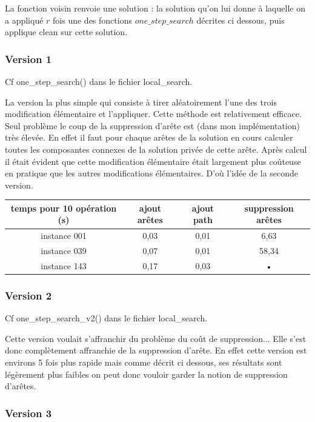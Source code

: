 \documentclass[10pt,a4paper]{article}
\begin{document}
La fonction voisin renvoie une solution : la solution qu'on lui donne à laquelle on a appliqué $r$ fois une des fonctions $one\_step\_search$ décrites ci dessous, puis applique clean sur cette solution.

\subsubsection{Version 1}

Cf one\_step\_search() dans le fichier local\_search.

La version la plus simple qui consiste à tirer aléatoirement l'une des trois modification élémentaire et l'appliquer. Cette méthode est relativement efficace. Seul problème le coup de la suppression d'arête est (dans mon implémentation) très élevée. En effet il faut pour chaque arêtes de la solution en cours calculer toutes les composantes connexes de la solution privée de cette arête. Après calcul il était évident que cette modification élémentaire était largement plus coûteuse en pratique que les autres modifications élémentaires. D’où l'idée de la seconde version.

\begin{tabular}{|c|c|c|c|}
\hline 
temps pour 10 opération (s) & ajout arêtes & ajout path & suppression arêtes \\ 
\hline 
instance 001 & 0,03 & 0,01 & 6,63 \\ 
\hline 
instance 039 & 0,07 & 0,01 & 58,34 \\ 
\hline 
instance  143 & 0,17 & 0,03 & • \\ 
\hline 
\end{tabular} 

\subsubsection{Version 2}
Cf one\_step\_search\_v2() dans le fichier local\_search.

Cette version voulait s'affranchir du problème du coût de suppression... Elle s'est donc complètement affranchie de la suppression d'arête. En effet cette version est environs 5 fois plus rapide mais comme décrit ci dessous, ses résultats sont légèrement plus faibles on peut donc vouloir garder la notion de suppression d'arêtes.

\subsubsection{Version 3}
\end{document}
